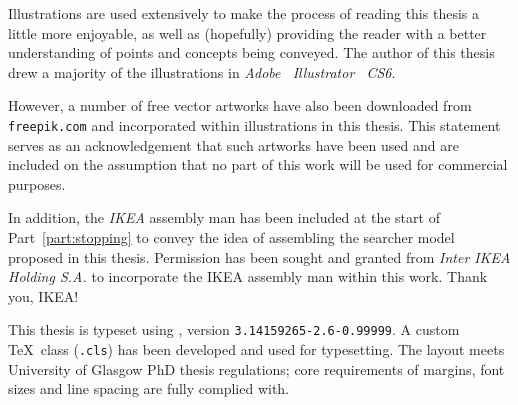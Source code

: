 \begin{preamble}
\noindent{}
Illustrations are used extensively to make the process of reading this thesis a little more enjoyable, as well as (hopefully) providing the reader with a better understanding of points and concepts being conveyed. The author of this thesis drew a majority of the illustrations in \emph{Adobe \textregistered~Illustrator \textregistered~CS6}.

However, a number of free vector artworks have also been downloaded from \texttt{freepik.com} and incorporated within illustrations in this thesis. This statement serves as an acknowledgement that such artworks have been used and are included on the assumption that no part of this work will be used for commercial purposes.

In addition, the \emph{IKEA} assembly man has been included at the start of Part~\ref{part:stopping} to convey the idea of assembling the searcher model proposed in this thesis. Permission has been sought and granted from \emph{Inter IKEA Holding S.A.} to incorporate the IKEA assembly man within this work. Thank you, IKEA!

\noindent{}
This thesis is typeset using \XeTeX, version \texttt{3.14159265-2.6-0.99999}. A custom \TeX\ class (\texttt{.cls}) has been developed and used for typesetting. The layout meets University of Glasgow PhD thesis regulations; core requirements of margins, font sizes and line spacing are fully complied with.

\end{preamble}

\newpage
\thispagestyle{empty}
\mbox{}
\newpage
\thispagestyle{empty}
\mbox{}
\newpage
